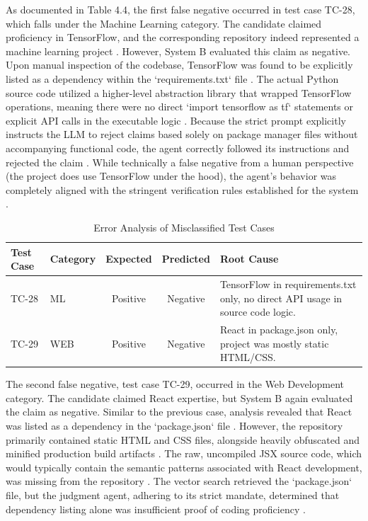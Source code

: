 As documented in Table 4.4, the first false negative occurred in test case TC-28, which falls under the Machine Learning category. The candidate claimed proficiency in TensorFlow, and the corresponding repository indeed represented a machine learning project \cite{ref66}. However, System B evaluated this claim as negative. Upon manual inspection of the codebase, TensorFlow was found to be explicitly listed as a dependency within the `requirements.txt` file \cite{ref77}. The actual Python source code utilized a higher-level abstraction library that wrapped TensorFlow operations, meaning there were no direct `import tensorflow as tf` statements or explicit API calls in the executable logic \cite{ref57}. Because the strict prompt explicitly instructs the LLM to reject claims based solely on package manager files without accompanying functional code, the agent correctly followed its instructions and rejected the claim \cite{ref64}. While technically a false negative from a human perspective (the project does use TensorFlow under the hood), the agent's behavior was completely aligned with the stringent verification rules established for the system \cite{ref78}.

\begin{table}[htbp]
\setlength{\tabcolsep}{12pt}
\renewcommand{\arraystretch}{1.2}
\setlength{\tabcolsep}{10pt}
\centering
\small
\caption{Error Analysis of Misclassified Test Cases}
\label{tab:error_analysis}
\begin{tabularx}{\textwidth}{llccX}
\toprule
\textbf{Test Case} & \textbf{Category} & \textbf{Expected} & \textbf{Predicted} & \textbf{Root Cause} \\ \midrule
TC-28 & ML & Positive & Negative & TensorFlow in requirements.txt only, no direct API usage in source code logic. \\
TC-29 & WEB & Positive & Negative & React in package.json only, project was mostly static HTML/CSS. \\ \bottomrule
\end{tabularx}
\end{table}

The second false negative, test case TC-29, occurred in the Web Development category. The candidate claimed React expertise, but System B again evaluated the claim as negative. Similar to the previous case, analysis revealed that React was listed as a dependency in the `package.json` file \cite{ref18}. However, the repository primarily contained static HTML and CSS files, alongside heavily obfuscated and minified production build artifacts \cite{ref40, ref49}. The raw, uncompiled JSX source code, which would typically contain the semantic patterns associated with React development, was missing from the repository \cite{ref50}. The vector search retrieved the `package.json` file, but the judgment agent, adhering to its strict mandate, determined that dependency listing alone was insufficient proof of coding proficiency \cite{ref11}. 

